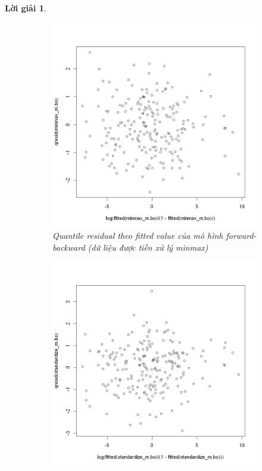 \documentclass[14pt, a4paper]{article}
\theoremstyle{sltheorem}
\theoremstyle{soltheorem}
\newtheorem*{loigiai}{Lời giải}
\begin{document}
\begin{loigiai}
    \begin{figure}[h!]
        \centering
        \begin{subfigure}[b]{0.4\textwidth}
            \centering
            \includegraphics[width=\textwidth]{figures/minmax_mbo_fitted.png}
            \caption{Quantile residual theo fitted value của mô hình forward-backward (dữ liệu được tiền xử lý minmax)}
        \end{subfigure}
        \hfill
        \begin{subfigure}[b]{0.4\textwidth}
            \centering
            \includegraphics[width=\textwidth]{figures/standardize_mbo_fitted.png}

\end{subfigure}
\end{figure}
\end{loigiai}
\end{document}
